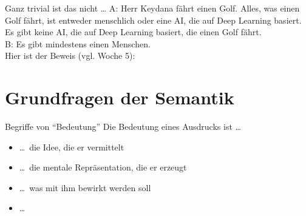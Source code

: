 \begin{frame}
  {Ganz trivial ist das nicht \ldots}
  \onslide<+->
  \onslide<+->
    A: Herr Keydana fährt einen Golf. Alles, was einen Golf fährt, ist entweder menschlich oder eine AI, die auf Deep Learning basiert. Es gibt keine AI, die auf Deep Learning basiert, die einen Golf fährt.\\
    \alert{B: Es gibt mindestens einen Menschen.}\\
    \onslide<+->
    \Halbzeile
    Hier ist der Beweis (vgl. Woche 5):\\
    \onslide<+->
    \Halbzeile
    \centering
\end{frame}

\section{Grundfragen der Semantik}

\begin{frame}
  {Begriffe von "`Bedeutung"'}
  \onslide<+->
  \onslide<+->
  Die Bedeutung eines Ausdrucks ist \ldots\\
  \Zeile
  \begin{itemize}[<+->]
    \item \ldots\ die Idee, die er vermittelt
    \item \ldots\ die mentale Repräsentation, die er erzeugt
    \item \ldots\ was mit ihm bewirkt werden soll
    \item \ldots\ 
  \end{itemize}
\end{frame}


